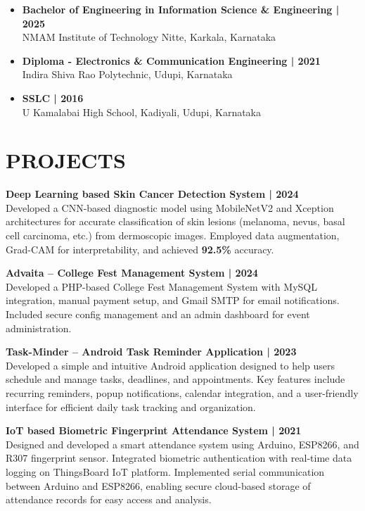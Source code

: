 \documentclass[10pt, letterpaper]{article}
\newcommand{\projecttitle}[2]{%
    {\fontsize{12pt}{14pt}\selectfont\textbf{#1 | #2}}\\[\parskip] %
}
\newcommand{\bodyfont}{\fontsize{10pt}{12pt}\selectfont}
\begin{document}
{\bodyfont
\begin{itemize}
    \item \textbf{Bachelor of Engineering in Information Science \& Engineering | 2025} \\
    NMAM Institute of Technology Nitte, Karkala, Karnataka
    \item \textbf{Diploma - Electronics \& Communication Engineering | 2021} \\
    Indira Shiva Rao Polytechnic, Udupi, Karnataka
    \item \textbf{SSLC | 2016} \\
    U Kamalabai High School, Kadiyali, Udupi, Karnataka
\end{itemize}
}

\section*{PROJECTS}

\projecttitle{Deep Learning based Skin Cancer Detection System}{2024}
{\bodyfont
\justifying
Developed a CNN-based diagnostic model using MobileNetV2 and Xception architectures for accurate classification of skin lesions (melanoma, nevus, basal cell carcinoma, etc.) from dermoscopic images. Employed data augmentation, Grad-CAM for interpretability, and achieved \textbf{92.5\%} accuracy.
}

\projecttitle{Advaita – College Fest Management System}{2024}
{\bodyfont
\justifying
Developed a PHP-based College Fest Management System with MySQL integration, manual payment setup, and Gmail SMTP for email notifications. Included secure config management and an admin dashboard for event administration.
}

\vspace{1.5em}

\projecttitle{Task-Minder – Android Task Reminder Application}{2023}
{\bodyfont
\justifying
Developed a simple and intuitive Android application designed to help users schedule and manage tasks, deadlines, and appointments. Key features include recurring reminders, popup notifications, calendar integration, and a user-friendly interface for efficient daily task tracking and organization.
}

\projecttitle{IoT based Biometric Fingerprint Attendance System}{2021}
{\bodyfont
\justifying
Designed and developed a smart attendance system using Arduino, ESP8266, and R307 fingerprint sensor. Integrated biometric authentication with real-time data logging on ThingsBoard IoT platform. Implemented serial communication between Arduino and ESP8266, enabling secure cloud-based storage of attendance records for easy access and analysis.
}
\end{document}
